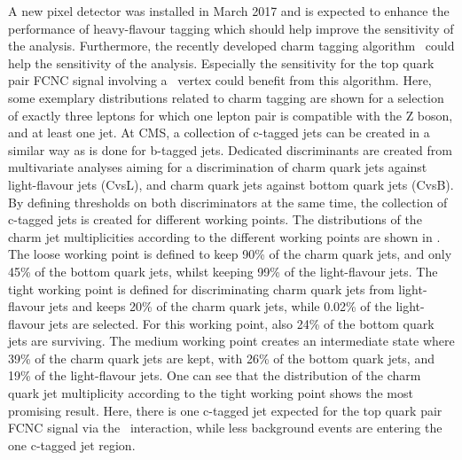 A new pixel detector was installed in March 2017 and is expected to enhance the performance of heavy-flavour tagging which should help improve the sensitivity of the analysis. Furthermore, the recently developed charm tagging algorithm~\cite{CMS-PAS-BTV-16-001} could help the sensitivity of the analysis.  Especially  the sensitivity for the top quark pair FCNC signal involving a \Zct\ vertex could benefit from this algorithm. Here, some exemplary distributions related to charm tagging are shown for a selection of exactly three leptons for which one lepton pair is compatible with the Z boson, and at least one jet. At CMS, a collection of c-tagged jets can be created in a similar way as is done for b-tagged jets. Dedicated discriminants are created from multivariate analyses aiming for a discrimination of charm quark jets against light-flavour jets (CvsL),  and charm quark jets against bottom quark jets (CvsB). By defining thresholds on both discriminators at the same time, the collection of c-tagged jets is created for different working points. The distributions of the charm jet multiplicities according to the different working points are shown in . The loose working point is defined to keep 90\% of the charm quark jets, and only 45\% of the bottom quark jets, whilst keeping 99\% of the light-flavour jets. The tight working point is defined for discriminating charm quark jets from light-flavour jets and keeps 20\% of the charm quark jets, while 0.02\% of the light-flavour jets are selected. For this working point, also 24\% of the bottom quark jets are surviving. The medium working point creates an intermediate state where 39\% of the charm quark jets are kept, with 26\% of the bottom quark jets, and 19\% of the light-flavour jets. One can see that the distribution of the charm quark jet multiplicity according to the tight working point shows the most promising result. Here, there is one c-tagged jet expected for the top quark pair FCNC signal via the \Zct\ interaction, while less background events are entering the one c-tagged jet region.


